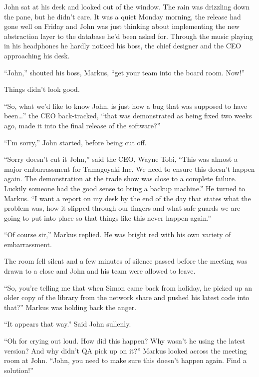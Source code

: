 \begin{trenches}
John sat at his desk and looked out of the window.
The rain was drizzling down the pane, but he didn't care.
It was a quiet Monday morning, the release had gone well on Friday and John was just thinking about implementing the new abstraction layer to the database he'd been asked for.
Through the music playing in his headphones he hardly noticed his boss, the chief designer and the CEO approaching his desk.

``John,'' shouted his boss, Markus, ``get your team into the board room. Now!''

Things didn't look good.

\thoughtbreak

``So, what we'd like to know John, is just how a bug that was supposed to have been\ldots'' the CEO back-tracked, ``that was demonstrated as being fixed two weeks ago, made it into the final release of the software?''

``I'm sorry,'' John started, before being cut off.

``Sorry doesn't cut it John,'' said the CEO, Wayne Tobi,
``This was almost a major embarrassment for Tamagoyaki Inc. We need to ensure this doesn't happen again. The demonstration at the trade show was close to a complete failure. Luckily someone had the good sense to bring a backup machine.''
He turned to Markus.
``I want a report on my desk by the end of the day that states what the problem was, how it slipped through our fingers and what safe guards we are going to put into place so that things like this never happen again.''

``Of course sir,'' Markus replied.
He was bright red with his own variety of embarrassment.

The room fell silent and a few minutes of silence passed before the meeting was drawn to a close and John and his team were allowed to leave.

\thoughtbreak

``So, you're telling me that when Simon came back from holiday, he picked up an older copy of the library from the network share and pushed his latest code into that?'' Markus was holding back the anger.

``It appears that way.'' Said John sullenly.

``Oh for crying out loud. How did this happen? Why wasn't he using the latest version? And why didn't QA pick up on it?'' Markus looked across the meeting room at John.
``John, you need to make sure this doesn't happen again. Find a solution!''
\end{trenches}

